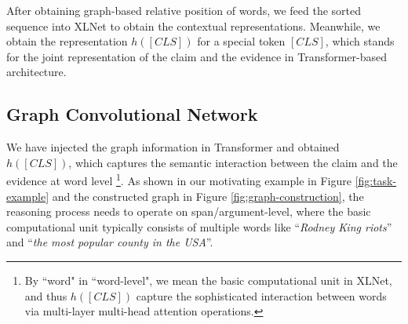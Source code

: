 \documentclass[11pt,a4paper]{article}
\begin{document}
After obtaining graph-based relative position of words, we feed
the sorted sequence
into XLNet to obtain the contextual representations. Meanwhile, we obtain the representation $h([CLS])$ for a special token $[CLS]$, which stands for the \mbox{joint} representation of the claim and the evidence in Transformer-based architecture.


\subsection{Graph Convolutional Network}
\label{section:gcn}
We have injected the graph information in Transformer and obtained $h([CLS])$, which captures the semantic interaction between the claim and the evidence at word level
\footnote{By ``word" in ``word-level", we mean the basic computational unit in XLNet, and thus $h([CLS])$ capture the sophisticated interaction between words via multi-layer multi-head attention operations. }.
As shown in our motivating example in Figure \ref{fig:task-example} and the constructed graph in Figure \ref{fig:graph-construction}, the reasoning process needs to operate on span/argument-level, where the basic computational unit typically consists of multiple words like ``\textit{Rodney King riots}'' and ``\textit{the most popular county in the USA}''. 
\end{document}
